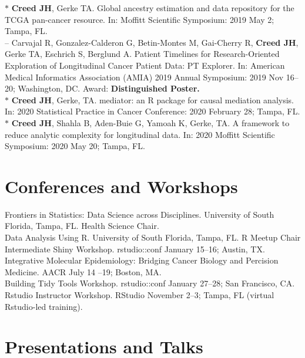 \documentclass[11pt, a4paper]{article} %
\newcommand{\years}[1]{\marginnote{\scriptsize \raise .3ex\hbox{#1}}} %
\begin{document}
$*$ {\bf Creed JH}, Gerke TA. Global ancestry estimation and data repository for the TCGA pan-cancer resource.  In: Moffitt Scientific Symposium: 2019 May 2; Tampa, FL. \\

-- Carvajal R, Gonzalez-Calderon G, Betin-Montes M, Gai-Cherry R, {\bf Creed JH}, Gerke TA, Eschrich S, Berglund A. Patient Timelines for Research-Oriented Exploration of Longitudinal Cancer Patient Data: PT Explorer. In: American Medical Informatics Association (AMIA) 2019 Annual Symposium: 2019 Nov 16--20; Washington, DC. Award: {\bf Distinguished Poster.}\\

$*$ {\bf Creed JH}, Gerke, TA. mediator: an R package for causal mediation analysis.  In: 2020 Statistical Practice in Cancer Conference: 2020 February 28; Tampa, FL. \\ 

$*$ {\bf Creed JH}, Shahla B, Aden-Buie G, Yamoah K, Gerke, TA. A framework to reduce analytic complexity for longitudinal data.  In: 2020 Moffitt Scientific Symposium: 2020 May 20; Tampa, FL. \\ 

\section*{Conferences and Workshops}

\years{2018} Frontiers in Statistics: Data Science across Disciplines. University of South Florida, Tampa, FL. Health Science Chair. \\
\years{2018} Data Analysis Using R. University of South Florida, Tampa, FL. R Meetup Chair \\ 
\years{2019} Intermediate Shiny Workshop. rstudio::conf January 15--16;  Austin, TX.  \\
\years{2019} Integrative Molecular Epidemiology: Bridging Cancer Biology and Percision Medicine. AACR July 14 --19; Boston, MA. \\
\years{2020} Building Tidy Tools Workshop. rstudio::conf January 27--28; San Francisco, CA.  \\
\years{2020} Rstudio Instructor Workshop. RStudio November 2--3; Tampa, FL (virtual Rstudio-led training). \\

\section*{Presentations and Talks}
\end{document}
